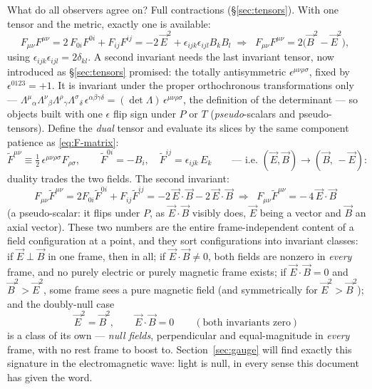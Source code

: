 \documentclass[11pt]{article}
\theoremstyle{plain}
\theoremstyle{definition}
\theoremstyle{remark}
\newcommand{\vE}{\vec{E}}
\newcommand{\vB}{\vec{B}}
\begin{document}
What do all observers agree on? Full contractions
(\S\ref{sec:tensors}). With one tensor and the metric, exactly one is
available:
\begin{equation}
  F_{\mu\nu}F^{\mu\nu}
  = 2\,F_{0i}F^{0i} + F_{ij}F^{ij}
  = -2\,\vE^2
  + \epsilon_{ijk}\epsilon_{ijl}B_k B_l
  \;\Longrightarrow\;
  \boxed{\;
  F_{\mu\nu}F^{\mu\nu} = 2\bigl(\vB^2 - \vE^2\bigr),
  \;}
  \label{eq:invariant-1}
\end{equation}
using $\epsilon_{ijk}\epsilon_{ijl} = 2\delta_{kl}$. A second
invariant needs the last invariant tensor, now introduced as
\S\ref{sec:tensors} promised: the totally antisymmetric
$\epsilon^{\mu\nu\rho\sigma}$, fixed by
$\epsilon^{0123} = +1$. It is invariant under the proper
orthochronous transformations only ---
$\Lambda^\mu{}_\alpha\Lambda^\nu{}_\beta\Lambda^\rho{}_\gamma
\Lambda^\sigma{}_\delta\,\epsilon^{\alpha\beta\gamma\delta}
= (\det\Lambda)\,\epsilon^{\mu\nu\rho\sigma}$, the definition of the
determinant --- so objects built with one $\epsilon$ flip sign under
$P$ or $T$ (\emph{pseudo}-scalars and pseudo-tensors). Define the
\emph{dual} tensor and evaluate its slices by the same component
patience as \eqref{eq:F-matrix}:
\begin{equation}
  \tilde F^{\mu\nu}
  \equiv \tfrac12\,\epsilon^{\mu\nu\rho\sigma}F_{\rho\sigma},
  \qquad
  \tilde F^{0i} = -B_i,
  \quad
  \tilde F^{ij} = \epsilon_{ijk}\,E_k
  \qquad
  \text{--- i.e.\ } (\vE, \vB) \to (\vB,\, -\vE) :
\end{equation}
duality trades the two fields. The second invariant:
\begin{equation}
  F_{\mu\nu}\tilde F^{\mu\nu}
  = 2F_{0i}\tilde F^{0i} + F_{ij}\tilde F^{ij}
  = -2\,\vE\cdot\vB - 2\,\vE\cdot\vB
  \;\Longrightarrow\;
  \boxed{\;
  F_{\mu\nu}\tilde F^{\mu\nu} = -\,4\,\vE\cdot\vB
  \;}
  \label{eq:invariant-2}
\end{equation}
(a pseudo-scalar: it flips under $P$, as $\vE\cdot\vB$ visibly does,
$\vE$ being a vector and $\vB$ an axial vector). These two numbers
are the entire frame-independent content of a field configuration at
a point, and they sort configurations into invariant classes:
if $\vE \perp \vB$ in one frame, then in all; if $\vE \cdot \vB \neq 0$,
both fields are nonzero in \emph{every} frame, and no purely electric
or purely magnetic frame exists; if $\vE \cdot \vB = 0$ and
$\vB^2 > \vE^2$, some frame sees a pure magnetic field (and
symmetrically for $\vE^2 > \vB^2$); and the doubly-null case
\begin{equation}
  \vE^2 = \vB^2,
  \qquad
  \vE \cdot \vB = 0
  \qquad(\text{both invariants zero})
\end{equation}
is a class of its own --- \emph{null fields}, perpendicular and
equal-magnitude in \emph{every} frame, with no rest frame to boost
to. Section~\ref{sec:gauge} will find exactly this signature in the
electromagnetic wave: light is null, in every sense this document has
given the word.
\end{document}
